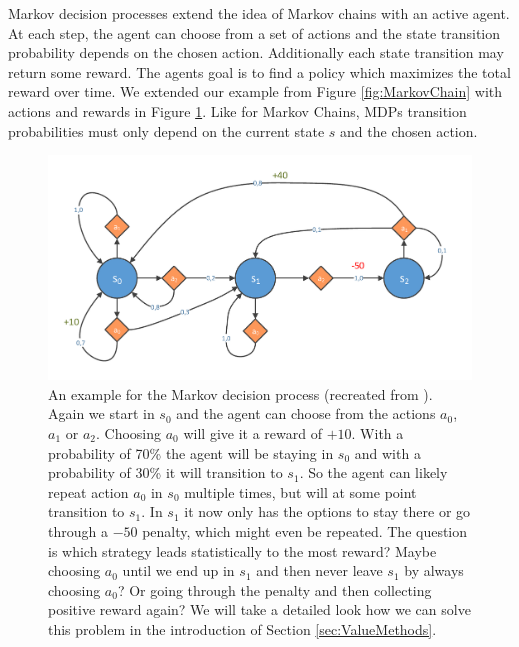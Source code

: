 Markov decision processes extend the idea of Markov chains with an active agent. At each step, the agent can choose from a set of actions and the state transition probability depends on the chosen action. Additionally each state transition may return some reward. The agents goal is to find a policy which maximizes the total reward over time. We extended our example from Figure \ref{fig:MarkovChain} with actions and rewards in Figure \ref{fig:MDP}. Like for Markov Chains, MDPs transition probabilities must only depend on the current state $s$ and the chosen action.

\begin{figure}[ht]
  
  \begin{center}
      \includegraphics[trim=10px 10px 10px 10px, clip, width=0.9\columnwidth]{figures/rl/markov_decision_process.pdf}
  \end{center}
  
  \caption[An Example for the Markov Decision Process Example]{An example for the Markov decision process (recreated from \cite{handson2019geron}). Again we start in $s_0$ and the agent can choose from the actions $a_0$, $a_1$ or $a_2$. Choosing $a_0$ will give it a reward of $+10$. With a probability of 70\% the agent will be staying in $s_0$ and with a probability of 30\% it will transition to $s_1$. So the agent can likely repeat action $a_0$ in $s_0$ multiple times, but will at some point transition to $s_1$. In $s_1$ it now only has the options to stay there or go through a $-50$ penalty, which might even be repeated. The question is which strategy leads statistically to the most reward? Maybe choosing $a_0$ until we end up in $s_1$ and then never leave $s_1$ by always choosing $a_0$? Or going through the penalty and then collecting positive reward again? We will take a detailed look how we can solve this problem in the introduction of Section \ref{sec:ValueMethods}.}
  \label{fig:MDP}
\end{figure}

